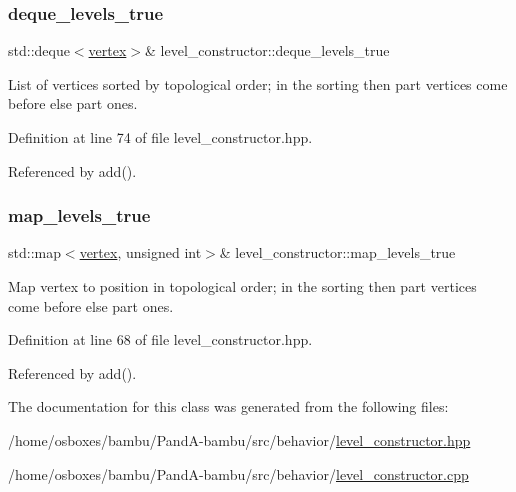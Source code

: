 \subsubsection{\texorpdfstring{deque\+\_\+levels\+\_\+true}{deque\_levels\_true}}
{\footnotesize\ttfamily std\+::deque$<$\hyperlink{graph_8hpp_abefdcf0544e601805af44eca032cca14}{vertex}$>$\& level\+\_\+constructor\+::deque\+\_\+levels\+\_\+true\hspace{0.3cm}{\ttfamily [private]}}



List of vertices sorted by topological order; in the sorting then part vertices come before else part ones. 



Definition at line 74 of file level\+\_\+constructor.\+hpp.



Referenced by add().

\mbox{\label{classlevel__constructor_a798b361dccf51771b22154d1e59835c5}} 
\subsubsection{\texorpdfstring{map\+\_\+levels\+\_\+true}{map\_levels\_true}}
{\footnotesize\ttfamily std\+::map$<$\hyperlink{graph_8hpp_abefdcf0544e601805af44eca032cca14}{vertex}, unsigned int$>$\& level\+\_\+constructor\+::map\+\_\+levels\+\_\+true\hspace{0.3cm}{\ttfamily [private]}}



Map vertex to position in topological order; in the sorting then part vertices come before else part ones. 



Definition at line 68 of file level\+\_\+constructor.\+hpp.



Referenced by add().



The documentation for this class was generated from the following files\+:\begin{DoxyCompactItemize}
\item 
/home/osboxes/bambu/\+Pand\+A-\/bambu/src/behavior/\hyperlink{level__constructor_8hpp}{level\+\_\+constructor.\+hpp}\item 
/home/osboxes/bambu/\+Pand\+A-\/bambu/src/behavior/\hyperlink{level__constructor_8cpp}{level\+\_\+constructor.\+cpp}\end{DoxyCompactItemize}
